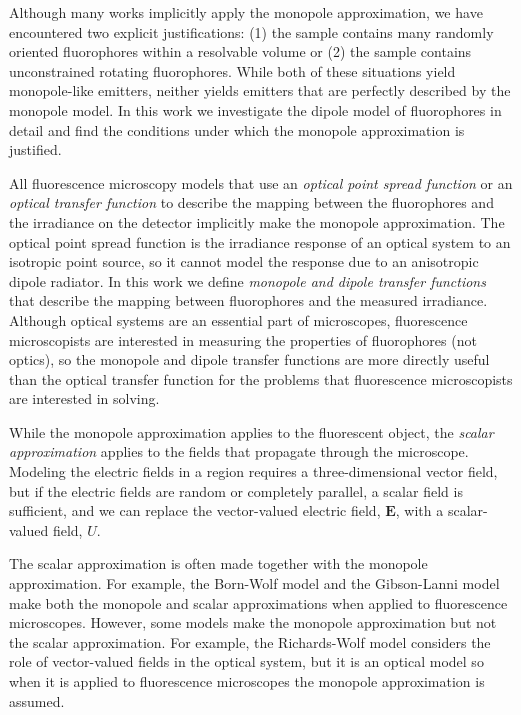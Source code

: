 \documentclass[]{osa-article}
\providecommand{\mb}[1]{\mathbf{#1}}
\begin{document}
Although many works implicitly apply the monopole approximation, we have
encountered two explicit justifications: (1) the sample contains many randomly
oriented fluorophores within a resolvable volume or (2) the sample contains
unconstrained rotating fluorophores. While both of these situations yield
monopole-like emitters, neither yields emitters that are perfectly described by
the monopole model. In this work we investigate the dipole model of fluorophores
in detail and find the conditions under which the monopole approximation is
justified.

All fluorescence microscopy models that use an \textit{optical point spread
  function} or an \textit{optical transfer function} to describe the mapping
between the fluorophores and the irradiance on the detector implicitly make the
monopole approximation. The optical point spread function is the irradiance
response of an optical system to an isotropic point source, so it cannot model
the response due to an anisotropic dipole radiator. In this work we define
\textit{monopole and dipole transfer functions} that describe the mapping
between fluorophores and the measured irradiance. Although optical systems are
an essential part of microscopes, fluorescence microscopists are interested in
measuring the properties of fluorophores (not optics), so the monopole and
dipole transfer functions are more directly useful than the optical transfer
function for the problems that fluorescence microscopists are interested in
solving.

While the monopole approximation applies to the fluorescent object, the
\textit{scalar approximation} applies to the fields that propagate through the
microscope. Modeling the electric fields in a region requires a
three-dimensional vector field, but if the electric fields are random or
completely parallel, a scalar field is sufficient, and we can replace the
vector-valued electric field, $\mb{E}$, with a scalar-valued field, $U$.

The scalar approximation is often made together with the monopole approximation.
For example, the Born-Wolf model \cite{born1980} and the Gibson-Lanni model
\cite{gibson89} make both the monopole and scalar approximations when applied to
fluorescence microscopes. However, some models make the monopole approximation
but not the scalar approximation. For example, the Richards-Wolf model
\cite{richards} considers the role of vector-valued fields in the optical
system, but it is an optical model so when it is applied to fluorescence
microscopes the monopole approximation is assumed. 
\end{document}
